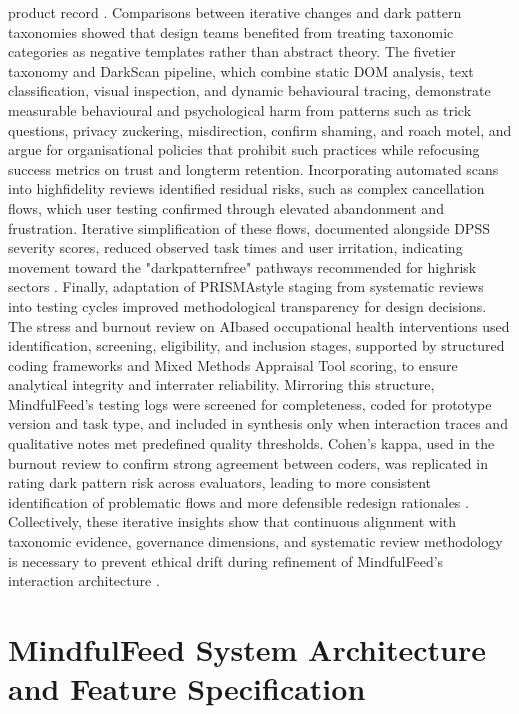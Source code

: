 \documentclass{article}
\begin{document}
product record \parencites[7]{7808872}[8]{7808872}. Comparisons between iterative changes and dark pattern taxonomies showed that design teams benefited from treating taxonomic categories as negative templates rather than abstract theory. The five\-tier taxonomy and DarkScan pipeline, which combine static DOM analysis, text classification, visual inspection, and dynamic behavioural tracing, demonstrate measurable behavioural and psychological harm from patterns such as trick questions, privacy zuckering, misdirection, confirm shaming, and roach motel, and argue for organisational policies that prohibit such practices while refocusing success metrics on trust and long\-term retention. Incorporating automated scans into high\-fidelity reviews identified residual risks, such as complex cancellation flows, which user testing confirmed through elevated abandonment and frustration. Iterative simplification of these flows, documented alongside DPSS severity scores, reduced observed task times and user irritation, indicating movement toward the "dark\-pattern\-free" pathways recommended for high\-risk sectors \parencites[2]{4807303}. Finally, adaptation of PRISMA\-style staging from systematic reviews into testing cycles improved methodological transparency for design decisions. The stress and burnout review on AI\-based occupational health interventions used identification, screening, eligibility, and inclusion stages, supported by structured coding frameworks and Mixed Methods Appraisal Tool scoring, to ensure analytical integrity and inter\-rater reliability. Mirroring this structure, MindfulFeed's testing logs were screened for completeness, coded for prototype version and task type, and included in synthesis only when interaction traces and qualitative notes met predefined quality thresholds. Cohen's kappa, used in the burnout review to confirm strong agreement between coders, was replicated in rating dark pattern risk across evaluators, leading to more consistent identification of problematic flows and more defensible redesign rationales \parencites[19]{8760542}. Collectively, these iterative insights show that continuous alignment with taxonomic evidence, governance dimensions, and systematic review methodology is necessary to prevent ethical drift during refinement of MindfulFeed's interaction architecture \parencites[2]{4807303}[3]{4692551}[7]{7808872}[19]{8760542}.

\section{MindfulFeed System Architecture and Feature Specification}
\end{document}
